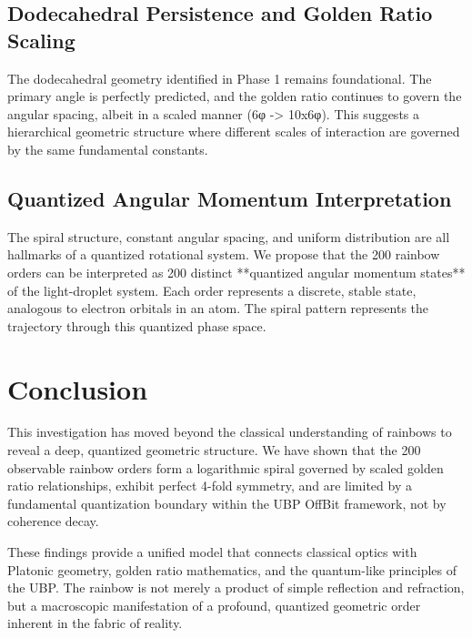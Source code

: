 \documentclass[12pt]{article}
\begin{document}
\subsection{Dodecahedral Persistence and Golden Ratio Scaling}
The dodecahedral geometry identified in Phase 1 remains foundational. The primary angle is perfectly predicted, and the golden ratio continues to govern the angular spacing, albeit in a scaled manner (6φ -> 10x6φ). This suggests a hierarchical geometric structure where different scales of interaction are governed by the same fundamental constants.

\subsection{Quantized Angular Momentum Interpretation}
The spiral structure, constant angular spacing, and uniform distribution are all hallmarks of a quantized rotational system. We propose that the 200 rainbow orders can be interpreted as 200 distinct **quantized angular momentum states** of the light-droplet system. Each order represents a discrete, stable state, analogous to electron orbitals in an atom. The spiral pattern represents the trajectory through this quantized phase space.

\section{Conclusion}
This investigation has moved beyond the classical understanding of rainbows to reveal a deep, quantized geometric structure. We have shown that the 200 observable rainbow orders form a logarithmic spiral governed by scaled golden ratio relationships, exhibit perfect 4-fold symmetry, and are limited by a fundamental quantization boundary within the UBP OffBit framework, not by coherence decay.

These findings provide a unified model that connects classical optics with Platonic geometry, golden ratio mathematics, and the quantum-like principles of the UBP. The rainbow is not merely a product of simple reflection and refraction, but a macroscopic manifestation of a profound, quantized geometric order inherent in the fabric of reality.
\end{document}
